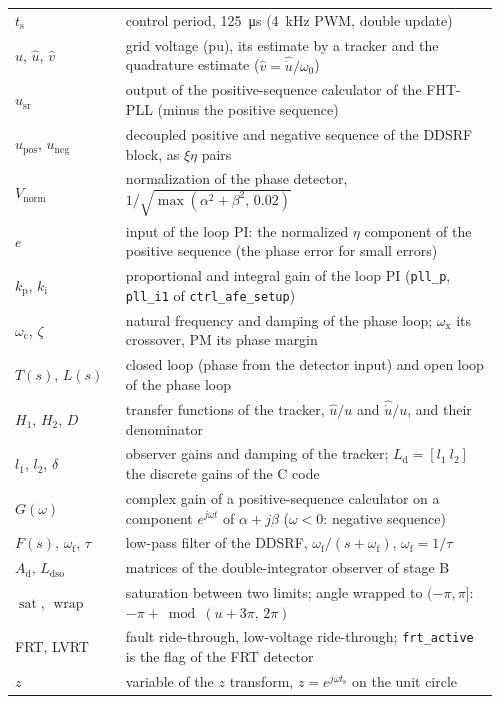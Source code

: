 \documentclass[11pt,a4paper]{scrartcl}
\newcommand{\ped}[1]{_{\mathrm{#1}}}
\newcommand{\code}[1]{\texttt{#1}}
\newcommand{\sat}{\operatorname{sat}}
\newcommand{\wrapop}{\operatorname{wrap}}
\begin{document}
\begin{onehalfspace}
\begin{longtable}{@{} >{\raggedright\arraybackslash}p{0.22\linewidth} p{0.74\linewidth} @{}}
	$t\ped{s}$ & control period, \SI{125}{\micro\second} (\SI{4}{\kilo\hertz} PWM, double update) \\
	$u$, $\hat u$, $\hat v$ & grid voltage (pu), its estimate by a tracker and the quadrature estimate ($\hat v = \hat{\dot u}/\omega_0$) \\
	$u\ped{sr}$ & output of the positive-sequence calculator of the FHT-PLL (minus the positive sequence) \\
	$u\ped{pos}$, $u\ped{neg}$ & decoupled positive and negative sequence of the DDSRF block, as $\xi\eta$ pairs \\
	$V\ped{norm}$ & normalization of the phase detector, $1/\sqrt{\max(\alpha^2+\beta^2,\,0.02)}$ \\
	$e$ & input of the loop PI: the normalized $\eta$ component of the positive sequence (the phase error for small errors) \\
	$k\ped{p}$, $k\ped{i}$ & proportional and integral gain of the loop PI (\code{pll\_p}, \code{pll\_i1} of \code{ctrl\_afe\_setup}) \\
	$\omega\ped{c}$, $\zeta$ & natural frequency and damping of the phase loop; $\omega\ped{x}$ its crossover, PM its phase margin \\
	$T(s)$, $L(s)$ & closed loop (phase from the detector input) and open loop of the phase loop \\
	$H_1$, $H_2$, $D$ & transfer functions of the tracker, $\hat u / u$ and $\hat{\dot u} / u$, and their denominator \\
	$l_1$, $l_2$, $\delta$ & observer gains and damping of the tracker; $L\ped{d} = [l_1\ l_2]$ the discrete gains of the C code \\
	$G(\omega)$ & complex gain of a positive-sequence calculator on a component $e^{j\omega t}$ of $\alpha + j\beta$ ($\omega < 0$: negative sequence) \\
	$F(s)$, $\omega\ped{f}$, $\tau$ & low-pass filter of the DDSRF, $\omega\ped{f}/(s+\omega\ped{f})$, $\omega\ped{f} = 1/\tau$ \\
	$A\ped{d}$, $L\ped{dso}$ & matrices of the double-integrator observer of stage B \\
	$\sat$, $\wrapop$ & saturation between two limits; angle wrapped to $(-\pi, \pi]$: $-\pi + \bmod(u + 3\pi,\, 2\pi)$ \\
	FRT, LVRT & fault ride-through, low-voltage ride-through; \code{frt\_active} is the flag of the FRT detector \\
	$z$ & variable of the $z$ transform, $z = e^{j\omega t\ped{s}}$ on the unit circle \\
\end{longtable}
\endgroup
\addtocounter{table}{-1}


\end{onehalfspace}
\end{document}
